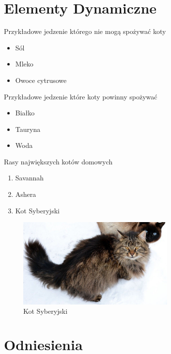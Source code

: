 \documentclass{beamer}
\begin{document}
\section{Elementy Dynamiczne}

\begin{frame}{Przykładowe jedzenie którego nie mogą spożywać koty}
  \begin{itemize}
    \item Sól
    \item Mleko
    \item Owoce cytrusowe
  \end{itemize}
\end{frame}

\begin{frame}{Przykładowe jedzenie które koty powinny spożywać}
  \begin{itemize}
    \item Białko
    \item Tauryna
    \item Woda
  \end{itemize}
\end{frame}

\begin{frame}{Rasy największych kotów domowych}
  \begin{enumerate}
    \item Savannah
    \item Ashera
    \item Kot Syberyjski
  \end{enumerate}
  \begin{figure}
    \centering
    \includegraphics[width=0.7\textwidth]{image2.png}
    \caption{Kot Syberyjski}
    \label{fig:rys2}
  \end{figure}
\end{frame}

\section{Odniesienia}
\end{document}
